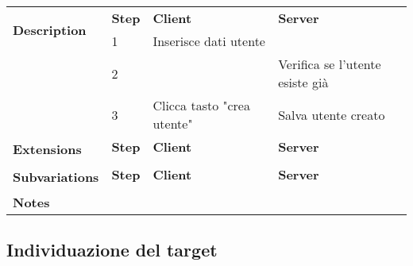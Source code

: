 \begin{table}[H]
\begin{tabularx}{\linewidth}{|l|X|X|X|}
        \hline \multirow{2}{*}{\textbf{Description}} & \textbf{Step}                                                                     &
        \textbf{Client}                              & \textbf{Server}                                                                                                                                  \\
        \cline{2-4}                                  & 1                                                                                 & Inserisce dati utente      &                                 \\
        \cline{2-4}                                  & 2                                                                                 &                            & Verifica se l'utente esiste già \\
        \cline{2-4}                                  & 3                                                                                 & Clicca tasto "crea utente" & Salva utente creato             \\
        \hline \multirow{2}{*}{\textbf{Extensions}}  & \textbf{Step}                                                                     &
        \textbf{Client}                              & \textbf{Server}                                                                                                                                  \\
        \cline{2-4}                                  &                                                                                   &                            &                                 \\
        \hline
        \multirow{2}{*}{\textbf{Subvariations}}      & \textbf{Step}                                                                     & \textbf{Client}            & \textbf{Server}                 \\

        \cline{2-4}                                  &                                                                                   &                            &                                 \\
        \hline \textbf{Notes}                        & \multicolumn{3}{l|}{}                                                                                                                            \\
        \hline
    \end{tabularx}

\end{table}

\subsection{Individuazione del target}
